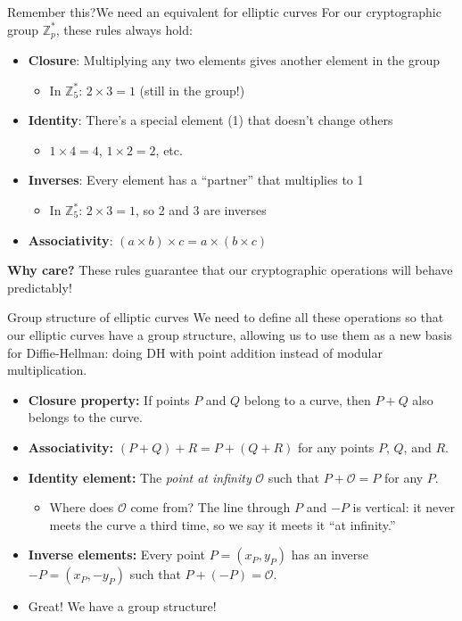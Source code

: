 \ifdefined\PRESENTATION\else\PassOptionsToClass{handout}{beamer}\fi\documentclass[aspectratio=169, lualatex]{beamer}
\begin{document}
\begin{frame}{Remember this?}{We need an equivalent for elliptic curves}
	For our cryptographic group $\mathbb{Z}_p^*$, these rules always hold:
	\begin{itemize}[<+->]
		\item \textbf{Closure}: Multiplying any two elements gives another element in the group
		      \begin{itemize}
			      \item In $\mathbb{Z}_5^*$: $2 \times 3 = 1$ (still in the group!)
		      \end{itemize}
		\item \textbf{Identity}: There's a special element (1) that doesn't change others
		      \begin{itemize}
			      \item $1 \times 4 = 4$, $1 \times 2 = 2$, etc.
		      \end{itemize}
		\item \textbf{Inverses}: Every element has a ``partner'' that multiplies to 1
		      \begin{itemize}
			      \item In $\mathbb{Z}_5^*$: $2 \times 3 = 1$, so 2 and 3 are inverses
		      \end{itemize}
		\item \textbf{Associativity}: $(a \times b) \times c = a \times (b \times c)$
	\end{itemize}
	\vspace{0.5cm}
	\textbf{Why care?} These rules guarantee that our cryptographic operations will behave predictably!
\end{frame}

\begin{frame}{Group structure of elliptic curves}
	We need to define all these operations so that our elliptic curves have a group structure, allowing us to use them as a new basis for Diffie-Hellman: doing DH with point addition instead of modular multiplication.
	\begin{itemize}[<+->]
		\item \textbf{Closure property:} If points $P$ and $Q$ belong to a curve, then $P + Q$ also belongs to the curve.
		\item \textbf{Associativity:} $(P + Q) + R = P + (Q + R)$ for any points $P$, $Q$, and $R$.
		\item \textbf{Identity element:} The \emph{point at infinity} $\mathcal{O}$ such that $P + \mathcal{O} = P$ for any $P$.
		      \begin{itemize}
			      \item Where does $\mathcal{O}$ come from? The line through $P$ and $-P$ is vertical: it never meets the curve a third time, so we say it meets it ``at infinity.''
		      \end{itemize}
		\item \textbf{Inverse elements:} Every point $P = (x_P, y_P)$ has an inverse $-P = (x_P, -y_P)$ such that $P + (-P) = \mathcal{O}$.
		\item Great! We have a group structure!
	\end{itemize}
\end{frame}
\end{document}
